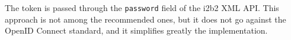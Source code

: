 The token is passed through the \verb|password| field of the i2b2 XML API.
This approach is not among the recommended ones, but it does not go against the OpenID Connect standard, and it simplifies greatly the implementation.







